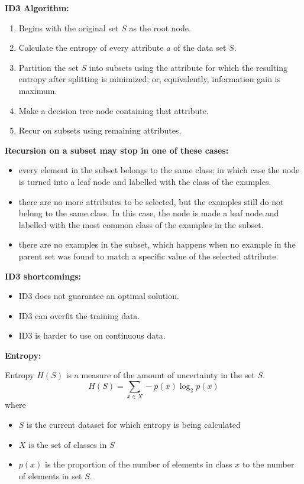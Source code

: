 \documentclass[a4paper, 11pt]{article}
\begin{document}
\textbf{ID3 Algorithm:}
\begin{enumerate}
	\item Begins with the original set $S$ as the root node.
	\item Calculate the entropy of every attribute $a$ of the data set $S$.
	\item Partition the set $S$ into subsets using the attribute for which the resulting entropy after splitting is minimized; or, equivalently, information gain is maximum.
	\item Make a decision tree node containing that attribute.
	\item Recur on subsets using remaining attributes.
\end{enumerate}

\textbf{Recursion on a subset may stop in one of these cases:}
\begin{itemize}
	\item every element in the subset belongs to the same class; in which case the node is turned into a leaf node and labelled with the class of the examples.
	\item there are no more attributes to be selected, but the examples still do not belong to the same class. In this case, the node is made a leaf node and labelled with the most common class of the examples in the subset.
	\item there are no examples in the subset, which happens when no example in the parent set was found to match a specific value of the selected attribute. 
\end{itemize}

\textbf{ID3 shortcomings:}
\begin{itemize}
	\item ID3 does not guarantee an optimal solution. 
	\item ID3 can overfit the training data. 
	\item ID3 is harder to use on continuous data.
\end{itemize}

\textbf{Entropy:}

Entropy $H(S)$ is a measure of the amount of uncertainty in the set $S$.
$$H(S)=\sum_{x\in X}-p(x)\log_2p(x)$$
where
\begin{itemize}
	\item $S$ is the current dataset for which entropy is being calculated
	\item $X$ is the set of classes in $S$
	\item $p(x)$ is the proportion of the number of elements in class $x$ to the number of elements in set $S$.
\end{itemize}
\end{document}
